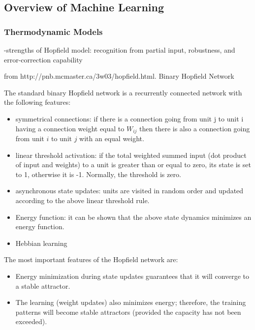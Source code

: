 \subsection{\label{sec:overview_of_machine_learning}Overview of Machine Learning}

\cite{mcpi1943}

\cite{ro1958}

\subsubsection{Thermodynamic Models}
\cite{ho1982}

-strengths of Hopfield model: recognition from partial input, robustness, and error-correction capability \cite{psfa1985}



from http://pnb.mcmaster.ca/3w03/hopfield.html.
Binary Hopfield Network

The standard binary Hopfield network is a recurrently connected network with the following features:
\begin{itemize}
\item symmetrical connections: if there is a connection going from unit j to unit i having a connection weight equal to $W_{ij}$ then there is also a connection going from unit $i$ to unit $j$ with an equal weight.
\item linear threshold activation: if the total weighted summed input (dot product of input and weights) to a unit is greater than or equal to zero, its state is set to 1, otherwise it is -1. Normally, the threshold is zero.
\item asynchronous state updates: units are visited in random order and updated according to the above linear threshold rule.
\item Energy function: it can be shown that the above state dynamics minimizes an energy function.
\item Hebbian learning
\end{itemize}

The most important features of the Hopfield network are:
\begin{itemize}
\item Energy minimization during state updates guarantees that it will converge to a stable attractor.
\item The learning (weight updates) also minimizes energy; therefore, the training patterns will become stable attractors (provided the capacity has not been exceeded).
\end{itemize}

